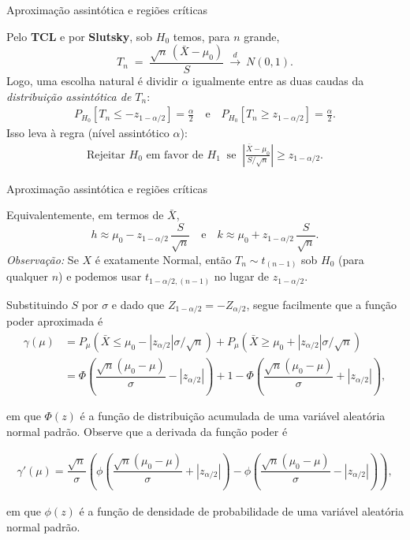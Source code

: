 \documentclass[12pt]{beamer}
\begin{document}
\begin{frame}{Aproximação assintótica e regiões críticas}
	\begin{block}{}
		\justifying
		Pelo \textbf{TCL} e por \textbf{Slutsky}, sob $H_0$ temos, para $n$ grande,
		\[
		T_n \;=\; \frac{\sqrt{n}\,(\bar X-\mu_0)}{S} \ \xrightarrow{d}\ N(0,1).
		\]
		Logo, uma escolha natural é dividir $\alpha$ igualmente entre as duas caudas da \emph{distribuição assintótica de $T_n$}:
		\begin{align}\label{t3}
			P_{H_0}\!\left[T_n \leq -z_{1-\alpha/2}\right] = \frac{\alpha}{2}
			\quad\text{e}\quad
			P_{H_0}\!\left[T_n \geq z_{1-\alpha/2}\right] = \frac{\alpha}{2}.
		\end{align}
		Isso leva à regra (nível assintótico $\alpha$):
		\begin{align}\label{t4}
			\text{Rejeitar } H_0 \text{ em favor de } H_1 \;\; \text{se} \;\;
			\left|\frac{\bar{X} - \mu_0}{S / \sqrt{n}}\right| \geq z_{1-\alpha/2}.
		\end{align}
	\end{block}
\end{frame}

\begin{frame}{Aproximação assintótica e regiões críticas}
	\begin{block}{}
		\justifying
		Equivalentemente, em termos de $\bar X$,
		\[
		h \approx \mu_0 - z_{1-\alpha/2}\,\frac{S}{\sqrt{n}}
		\quad\text{e}\quad
		k \approx \mu_0 + z_{1-\alpha/2}\,\frac{S}{\sqrt{n}}.
		\]
		\smallskip
		\textit{Observação:} Se $X$ é exatamente Normal, então $T_n \sim t_{(n-1)}$ sob $H_0$ (para qualquer $n$) e podemos usar $t_{1-\alpha/2,(n-1)}$ no lugar de $z_{1-\alpha/2}$.
	\end{block}
\end{frame}


\begin{frame}{}
\begin{block}{}
\justifying
Substituindo $S$ por $\sigma$ e dado que $Z_{1-\alpha/2}=-Z_{\alpha/2}$, segue facilmente que a função poder aproximada é
\begin{align*}\label{t5}
\gamma(\mu) &= P_{\mu}(\bar{X} \leq \mu_0 - |z_{\alpha/2}| \sigma / \sqrt{n}) + P_{\mu}(\bar{X} \geq \mu_0 + |z_{\alpha/2}| \sigma / \sqrt{n})\\
&= \Phi\left(\dfrac{\sqrt{n}(\mu_0 - \mu)}{\sigma} - |z_{\alpha/2}|\right) + 1 - \Phi\left(\dfrac{\sqrt{n}(\mu_0 - \mu)}{\sigma} + |z_{\alpha/2}|\right), 
\end{align*}

em que $\Phi(z)$ é a função de distribuição acumulada de uma variável aleatória normal padrão. Observe que a derivada da função poder é

\begin{align*}
\gamma'(\mu) = \dfrac{\sqrt{n}}{\sigma} \left(\phi\left(\dfrac{\sqrt{n}(\mu_0 - \mu)}{\sigma} + |z_{\alpha/2}|\right) - \phi\left(\dfrac{\sqrt{n}(\mu_0 - \mu)}{\sigma} - |z_{\alpha/2}|\right)\right),
\end{align*}

em que $\phi(z)$ é a função de densidade de probabilidade de uma variável aleatória normal padrão. 
\end{block}
\end{frame}
\end{document}
